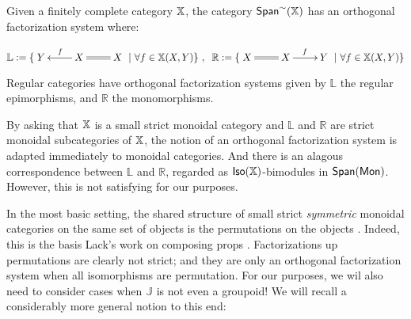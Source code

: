 \begin{example}
Given a finitely complete category $\mathbb{X}$, the category $\mathsf{Span}^\sim(\mathbb{X})$ has an orthogonal factorization system where:

$$\mathbb{L}:=
\{\xymatrix{Y & X \ar@{=}[r] \ar[l]_{f } & X}    \  | \ \forall f \in \X(X,Y)  \}\ , \hspace*{.2cm}
\mathbb{R}:=
\{ \xymatrix{X & X \ar@{=}[l] \ar[r]^{f } & Y}    \  | \ \forall f \in \X(X,Y) \}
$$

\end{example}


\begin{example}
Regular categories have orthogonal factorization systems given by $\mathbb{L}$ the regular epimorphisms, and $\mathbb R$ the monomorphisms.
\end{example}



By asking that $\mathbb{X}$ is a small strict monoidal category and  $\mathbb{L}$ and $\mathbb{R}$ are strict monoidal subcategories of $\mathbb{X}$, the notion of an orthogonal factorization system is adapted immediately to monoidal categories. And there is an alagous correspondence  between $\mathbb{L}$ and $\mathbb{R}$, regarded as ${\sf Iso}(\mathbb{X})$-bimodules in $\mathsf{Span}({\sf Mon})$.  However, this is not satisfying for our purposes.

 In the most basic setting, the shared structure of small strict {\em symmetric} monoidal categories on the same set of objects is the permutations on the objects .  Indeed, this is the basis Lack's work on composing props \cite{lack}. Factorizations up permutations are clearly not strict; and they are only an orthogonal factorization system when all isomorphisms are permutation.  For our purposes, we wil also need to consider cases when $\mathbb J$ is not even a groupoid!  We will recall a considerably more general notion to this end:

